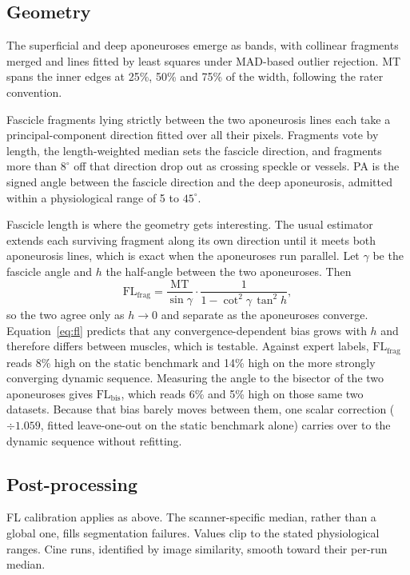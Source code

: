 \documentclass[12pt]{article}
\begin{document}
\subsection{Geometry}
\label{sec:fl}

The superficial and deep aponeuroses emerge as bands, with collinear fragments
merged and lines fitted by least squares under MAD-based outlier rejection. MT
spans the inner edges at 25\%, 50\% and 75\% of the width, following the rater
convention.

Fascicle fragments lying strictly between the two aponeurosis lines each take a
principal-component direction fitted over all their pixels. Fragments vote by
length, the length-weighted median sets the fascicle direction, and fragments
more than $8^{\circ}$ off that direction drop out as crossing speckle or
vessels. PA is the signed angle between the fascicle direction and the deep
aponeurosis, admitted within a physiological range of 5 to $45^{\circ}$.

Fascicle length is where the geometry gets interesting. The usual estimator
extends each surviving fragment along its own direction until it meets both
aponeurosis lines, which is exact when the aponeuroses run parallel. Let
$\gamma$ be the fascicle angle and $h$ the half-angle between the two
aponeuroses. Then
\begin{equation}
\mathrm{FL}_{\mathrm{frag}}
= \frac{\mathrm{MT}}{\sin\gamma}\cdot
\frac{1}{1-\cot^{2}\gamma\,\tan^{2}h},
\label{eq:fl}
\end{equation}
so the two agree only as $h \rightarrow 0$ and separate as the aponeuroses
converge. Equation~\eqref{eq:fl} predicts that any convergence-dependent bias
grows with $h$ and therefore differs between muscles, which is testable. Against
expert labels, $\mathrm{FL}_{\mathrm{frag}}$ reads 8\% high on the static
benchmark and 14\% high on the more strongly converging dynamic sequence.
Measuring the angle to the bisector of the two aponeuroses gives
$\mathrm{FL}_{\mathrm{bis}}$, which reads 6\% and 5\% high on those same two
datasets. Because that bias barely moves between them, one scalar correction
($\div 1.059$, fitted leave-one-out on the static benchmark alone) carries over
to the dynamic sequence without refitting.

\subsection{Post-processing}

FL calibration applies as above. The scanner-specific median, rather than a
global one, fills segmentation failures. Values clip to the stated physiological
ranges. Cine runs, identified by image similarity, smooth toward their per-run
median.
\end{document}
